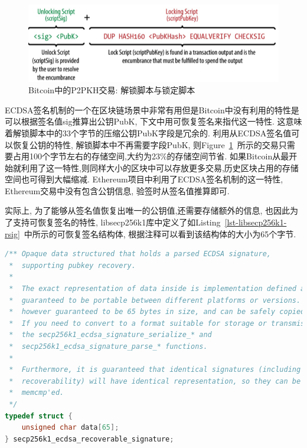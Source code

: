 \documentclass{article}
\begin{document}
\begin{figure}[h]
\centering
\includegraphics[width=\textwidth]{./bitcoin-p2pkh.png}
\caption{Bitcoin中的P2PKH交易: 解锁脚本与锁定脚本}\label{fig-bitcoin-p2phk}
\end{figure}

ECDSA签名机制的一个在区块链场景中非常有用但是Bitcoin中没有利用的特性是可以根据签名值\textsf{sig}推算出公钥\textsf{PubK},
下文中用可恢复签名来指代这一特性.
这意味着解锁脚本中的33个字节的压缩公钥\textsf{PubK}字段是冗余的.
利用从ECDSA签名值可以恢复公钥的特性, 解锁脚本中不再需要字段\textsf{PubK},
则Figure~\ref{fig-bitcoin-p2phk}~所示的交易只需要占用100个字节左右的存储空间,大约为23\%的存储空间节省.
如果Bitcoin从最开始就利用了这一特性,则同样大小的区块中可以存放更多交易,历史区块占用的存储空间也可得到大幅缩减.
Ethereum项目中利用了ECDSA签名机制的这一特性, Ethereum交易中没有包含公钥信息, 验签时从签名值推算即可.

实际上, 为了能够从签名值恢复出唯一的公钥值,还需要存储额外的信息,
也因此为了支持可恢复签名的特性, libsecp256k1库中定义了如Listing~\ref{lst-libsecp256k1-rsig}~中所示的可恢复签名结构体,
 根据注释可以看到该结构体的大小为65个字节.

\begin{lstlisting}[language=c, caption = libsecp256k1中的\textsf{secp256k1_ecdsa_recoverable_signature}, label=lst-libsecp256k1-rsig]
/** Opaque data structured that holds a parsed ECDSA signature,
 *  supporting pubkey recovery.
 *
 *  The exact representation of data inside is implementation defined and not
 *  guaranteed to be portable between different platforms or versions. It is
 *  however guaranteed to be 65 bytes in size, and can be safely copied/moved.
 *  If you need to convert to a format suitable for storage or transmission, use
 *  the secp256k1_ecdsa_signature_serialize_* and
 *  secp256k1_ecdsa_signature_parse_* functions.
 *
 *  Furthermore, it is guaranteed that identical signatures (including their
 *  recoverability) will have identical representation, so they can be
 *  memcmp'ed.
 */
typedef struct {
    unsigned char data[65];
} secp256k1_ecdsa_recoverable_signature;
\end{lstlisting}
\end{document}
